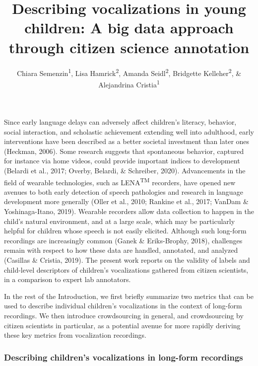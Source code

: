 \documentclass[english,,man]{apa6}
\author{Chiara Semenzin\textsuperscript{1}, Lisa Hamrick\textsuperscript{2}, Amanda Seidl\textsuperscript{2}, Bridgette Kelleher\textsuperscript{2}, \& Alejandrina Cristia\textsuperscript{1}}
\affiliation{
\vspace{0.5cm}
\textsuperscript{1} Laboratoire de Sciences Cognitives et de Psycholinguistique, Département d'Etudes cognitives, ENS, EHESS, CNRS, PSL University\\\textsuperscript{2} Purdue University}
\title{Describing vocalizations in young children: A big data approach through citizen science annotation}
\date{}
\begin{document}
\maketitle

Since early language delays can adversely affect children's literacy, behavior, social interaction, and scholastic achievement extending well into adulthood, early interventions have been described as a better societal investment than later ones (Heckman, 2006). Some research suggests that spontaneous behavior, captured for instance via home videos, could provide important indices to development (Belardi et al., 2017; Overby, Belardi, \& Schreiber, 2020). Advancements in the field of wearable technologies, such as LENA\textsuperscript{TM} recorders, have opened new avenues to both early detection of speech pathologies and research in language development more generally (Oller et al., 2010; Rankine et al., 2017; VanDam \& Yoshinaga-Itano, 2019). Wearable recorders allow data collection to happen in the child's natural environment, and at a large scale, which may be particularly helpful for children whose speech is not easily elicited. Although such long-form recordings are increasingly common (Ganek \& Eriks-Brophy, 2018), challenges remain with respect to how these data are handled, annotated, and analyzed (Casillas \& Cristia, 2019). The present work reports on the validity of labels and child-level descriptors of children's vocalizations gathered from citizen scientists, in a comparison to expert lab annotators.

In the rest of the Introduction, we first briefly summarize two metrics that can be used to describe individual children's vocalizations in the context of long-form recordings. We then introduce crowdsourcing in general, and crowdsourcing by citizen scientists in particular, as a potential avenue for more rapidly deriving these key metrics from vocalization recordings.

\hypertarget{describing-childrens-vocalizations-in-long-form-recordings}{%
\subsubsection{Describing children's vocalizations in long-form recordings}\label{describing-childrens-vocalizations-in-long-form-recordings}}
\end{document}
